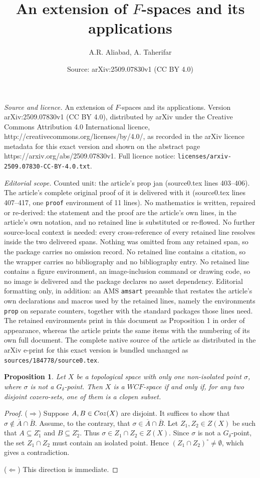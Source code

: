 \documentclass[10pt,a4paper]{amsart}
\title{An extension of $F$-spaces and its applications}
\author{A.R. Aliabad, A. Taherifar}
\date{Source: arXiv:2509.07830v1 (CC BY 4.0)}
\newtheorem{prop}{Proposition}
\newcommand{\cc}{\circ}
\newcommand{\coz}{{\rm Coz}}
\newcommand{\de}{\delta}
\newcommand{\ov}{\overline}
\newcommand{\si}{\sigma}
\begin{document}
\maketitle

\noindent\emph{Source and licence.} An extension of $F$-spaces and its applications. Version arXiv:2509.07830v1 (CC BY 4.0), distributed by arXiv under the Creative Commons Attribution 4.0 International licence, http://creativecommons.org/licenses/by/4.0/, as recorded in the arXiv licence metadata for this exact version and shown on the abstract page https://arxiv.org/abs/2509.07830v1. Full licence notice: \texttt{licenses/arxiv-2509.07830-CC-BY-4.0.txt}.\par\smallskip

\noindent\textit{Editorial scope.} Counted unit: the article's prop jan (source0.tex lines 403--406). The article's complete original proof of it is delivered with it (source0.tex lines 407--417, one \texttt{proof} environment of 11 lines). No mathematics is written, repaired or re-derived: the statement and the proof are the article's own lines, in the article's own notation, and no retained line is substituted or re-flowed.  No further source-local context is needed: every cross-reference of every retained line resolves inside the two delivered spans.  Nothing was omitted from any retained span, so the package carries no omission record.  No retained line contains a citation, so the wrapper carries no bibliography and no bibliography entry.  No retained line contains a figure environment, an image-inclusion command or drawing code, so no image is delivered and the package declares no asset dependency.  Editorial formatting only, in addition: an AMS \texttt{amsart} preamble that restates the article's own declarations and macros used by the retained lines, namely the environments \texttt{prop} on separate counters, together with the standard packages those lines need.  The retained environments print in this document as Proposition 1 in order of appearance, whereas the article prints the same items with the numbering of its own full document.  The complete native source of the article as distributed in the arXiv e-print for this exact version is bundled unchanged as \texttt{sources/184778/source0.tex}.
\begin{prop}\label{jan}
Let $X$ be a topological space with only one non-isolated point $\si$, where $\si$ is not a $G_\de$-point.  
Then $X$ is a $WCF$-space if and only if, for any two disjoint cozero-sets, one of them is a clopen subset.
\end{prop}

\begin{proof}
($\Rightarrow$)  
Suppose $A,B\in\coz(X)$ are disjoint. It suffices to show that $\si\notin \ov{A}\cap \ov{B}$.  
Assume, to the contrary, that $\si\in \ov{A}\cap \ov{B}$.  
Let $Z_1,Z_2\in Z(X)$ be such that $A\subseteq Z_1^\cc$ and $B\subseteq Z_2^\cc$.  
Thus $\si\in Z_1\cap Z_2 \in Z(X)$.  Since $\si$ is not a $G_\de$-point, the set $Z_1\cap Z_2$ must contain an isolated point.  
Hence $(Z_1\cap Z_2)^\cc\neq\emptyset$, which gives a contradiction.  

($\Leftarrow$)  
This direction is immediate.
\end{proof}
\end{document}
